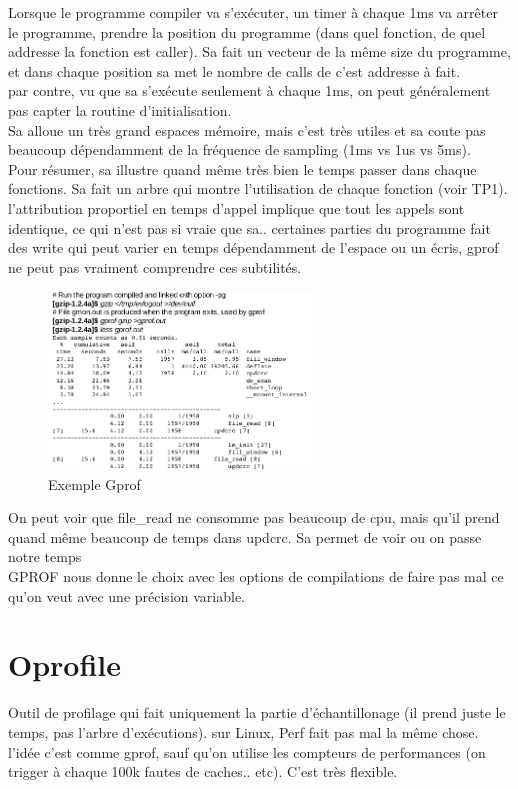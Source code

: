 \documentclass[oneside]{book}
\begin{document}
Lorsque le programme compiler va s'exécuter, un timer à chaque 1ms va arrêter le programme, prendre la position du programme (dans quel fonction, de quel addresse la fonction est caller). Sa fait un vecteur de la même size du programme, et dans chaque position sa met le nombre de calls de c'est addresse à fait. \\

par contre, vu que sa s'exécute seulement à chaque 1ms, on peut généralement pas capter la routine d'initialisation. \\

Sa alloue un très grand espaces mémoire, mais c'est très utiles et sa coute pas beaucoup dépendamment de la fréquence de sampling (1ms vs 1us vs 5ms).\\

Pour résumer, sa illustre quand même très bien le temps passer dans chaque fonctions. Sa fait un arbre qui montre l'utilisation de chaque fonction (voir TP1).\\

l'attribution proportiel en temps d'appel implique que tout les appels sont identique, ce qui n'est pas si vraie que sa.. certaines parties du programme fait des write qui peut varier en temps dépendamment de l'espace ou un écris, gprof ne peut pas vraiment comprendre ces subtilités.\\

\begin{figure}[!ht]
\centering
\includegraphics[width = 7cm]{gprof.png}
\caption{Exemple Gprof}
\label{fig:gprof}
\end{figure}

On peut voir que file\_read ne consomme pas beaucoup de cpu, mais qu'il prend quand même beaucoup de temps dans updcrc. Sa permet de voir ou on passe notre temps\\

GPROF nous donne le choix avec les options de compilations de faire pas mal ce qu'on veut avec une précision variable.

\section{Oprofile}
Outil de profilage qui fait uniquement la partie d'échantillonage (il prend juste le temps, pas l'arbre d'exécutions). sur Linux, Perf fait pas mal la même chose. l'idée c'est comme gprof, sauf qu'on utilise les compteurs de performances (on trigger à chaque 100k fautes de caches.. etc). C'est très flexible.\\
\end{document}

